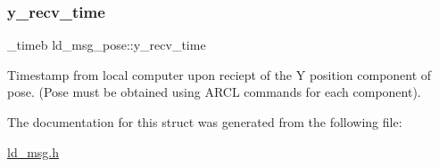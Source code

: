 \subsubsection{\texorpdfstring{y\+\_\+recv\+\_\+time}{y\_recv\_time}}
{\footnotesize\ttfamily \+\_\+timeb ld\+\_\+msg\+\_\+pose\+::y\+\_\+recv\+\_\+time}

Timestamp from local computer upon reciept of the Y position component of pose. (Pose must be obtained using A\+R\+CL commands for each component). 

The documentation for this struct was generated from the following file\+:\begin{DoxyCompactItemize}
\item 
\hyperlink{ld__msg_8h}{ld\+\_\+msg.\+h}\end{DoxyCompactItemize}
